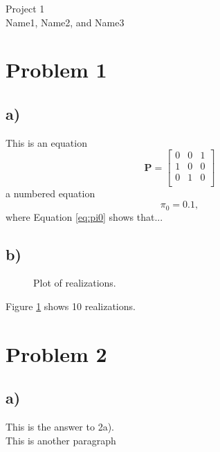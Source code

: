 \documentclass[a4paper, 11pt]{article}
\begin{document}
\begin{center}
{\LARGE{Project 1 \\[12pt] Name1, Name2, and Name3}}
\end{center}


\section*{Problem 1}

\subsection*{a)}
This is an equation
\[
    \mathbf{P} = \begin{bmatrix} 0 & 0 & 1 \\
                                 1 & 0 & 0 \\
                                 0 & 1 & 0 \\
                 \end{bmatrix}
\]
a numbered equation
\begin{equation}
    \pi_0 = 0.1 \label{eq:pi0},
\end{equation}
where Equation \eqref{eq:pi0} shows that...

\subsection*{b)}


\begin{figure}[ht]
 \begin{center}
 \end{center}
 \caption{Plot of realizations.} \label{fig1}
 \end{figure}
Figure \ref{fig1} shows 10 realizations.



\section*{Problem 2}

\subsection*{a)}
This is the answer to 2a).\\

\noindent
This is another paragraph
\end{document}
